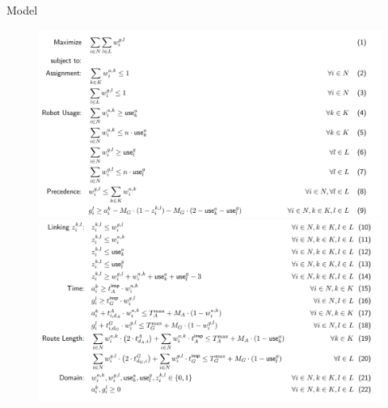 \documentclass[11pt,xcolor={dvipsnames},hyperref={pdftex,pdfpagemode=UseNone,hidelinks,pdfdisplaydoctitle=true},usepdftitle=false]{beamer}
\begin{document}
    \begin{frame}{Model}
      \begin{figure}
        \begin{minipage}{0.5\textwidth}
          \includegraphics[width=\textwidth]{figures/opt1.pdf}
        \end{minipage}
        \hfill
        \begin{minipage}{0.5\textwidth}
          \includegraphics[width=\textwidth]{figures/opt2.pdf}
        \end{minipage}
      \end{figure}
    \end{frame}
\end{document}
